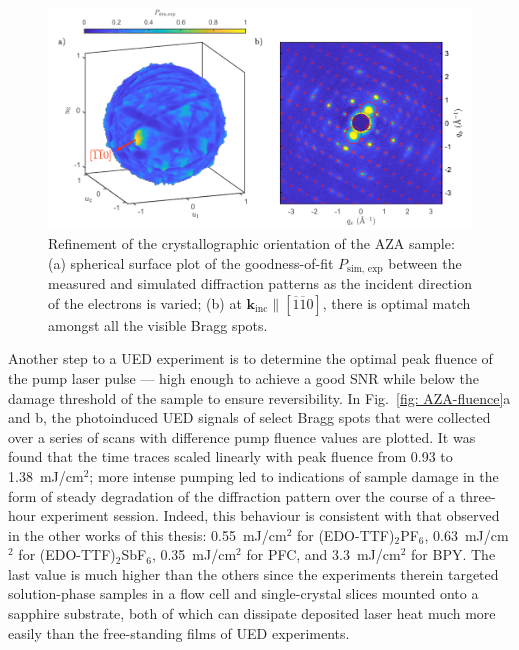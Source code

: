 \begin{figure}[t!]
  \centering
  \includegraphics[width = \textwidth]{Figures/fig_UED_orientation.pdf}
  \caption[Refinement of the crystallographic orientation of the AZA sample.]{
    Refinement of the crystallographic orientation of the AZA sample:
    (a) spherical surface plot of the goodness-of-fit $P_\text{sim, exp}$
    between the measured and simulated diffraction patterns
    as the incident direction of the electrons is varied;
    (b) at $\boldsymbol{k}_\text{inc} \parallel [ \overline{1} \overline{1} 0]$,
    there is optimal match amongst all the visible Bragg spots.
  }
  \label{fig: AZA-orientation}
\end{figure}

Another step to a UED experiment is to determine the optimal peak fluence
of the pump laser pulse --- high enough to achieve a good SNR
while below the damage threshold of the sample to ensure reversibility.
%
In Fig.~\ref{fig: AZA-fluence}a and b,
the photoinduced UED signals of select Bragg spots that were collected over a series of scans
with difference pump fluence values are plotted.
%
It was found that the time traces scaled linearly with peak fluence from 0.93 to 1.38~mJ/cm$^2$;
more intense pumping led to indications of sample damage in the form of
steady degradation of the diffraction pattern over the course of a three-hour experiment session.
%
Indeed, this behaviour is consistent with that observed in the other works of this thesis:
0.55~mJ/cm$^2$ for (EDO-TTF)$_2$PF$_6$, 0.63~mJ/cm$^2$ for (EDO-TTF)$_2$SbF$_6$,
0.35~mJ/cm$^2$ for PFC, and 3.3~mJ/cm$^2$ for BPY.
%
The last value is much higher than the others since the experiments therein targeted
solution-phase samples in a flow cell and single-crystal slices mounted onto a sapphire substrate,
both of which can dissipate deposited laser heat much more easily than
the free-standing films of UED experiments.

